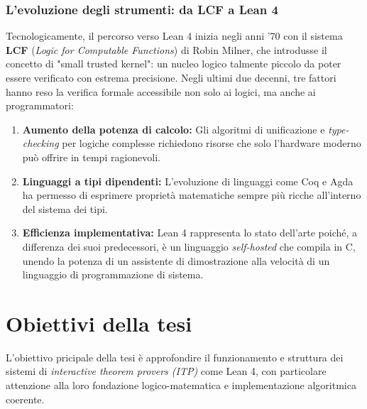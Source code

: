 \subsubsection{L'evoluzione degli strumenti: da LCF a Lean 4}
Tecnologicamente, il percorso verso Lean 4 inizia negli anni '70 con il sistema \textbf{LCF} (\emph{Logic for Computable Functions}) di Robin Milner, che introdusse 
il concetto di "small trusted kernel": un nucleo logico talmente piccolo da poter essere verificato con estrema precisione. Negli ultimi due decenni, tre fattori hanno 
reso la verifica formale accessibile non solo ai logici, ma anche ai programmatori:
\begin{enumerate}
    \item \textbf{Aumento della potenza di calcolo:} Gli algoritmi di unificazione e \emph{type-checking} per logiche complesse richiedono risorse che solo l'hardware moderno può offrire in tempi ragionevoli.
    \item \textbf{Linguaggi a tipi dipendenti:} L'evoluzione di linguaggi come Coq e Agda ha permesso di esprimere proprietà matematiche sempre più ricche all'interno del sistema dei tipi.
    \item \textbf{Efficienza implementativa:} Lean 4 rappresenta lo stato dell'arte poiché, a differenza dei suoi predecessori, è un linguaggio \emph{self-hosted} che compila in C, unendo la potenza di un assistente di dimostrazione alla velocità di un linguaggio di programmazione di sistema.
\end{enumerate}

\section{Obiettivi della tesi}
L'obiettivo pricipale della tesi è approfondire il funzionamento e struttura dei sistemi di \emph{interactive theorem provers (ITP)} come Lean 4, 
con particolare attenzione alla loro fondazione logico-matematica e implementazione algoritmica coerente.

